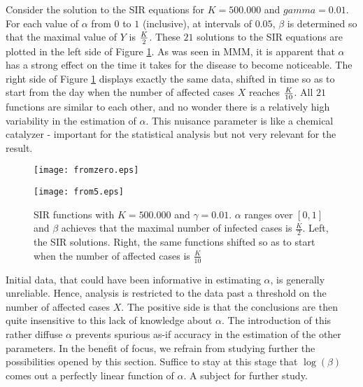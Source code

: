 \documentclass{article}
\begin{document}
 

Consider the solution to the SIR equations for $K=500.000$ and $gamma=0.01$. For each value of $\alpha$ from $0$ to $1$ (inclusive), at intervals of $0.05$, $\beta$ is determined so that the maximal value of $Y$ is ${K \over 2}$. These $21$ solutions to the SIR equations are plotted in the left side of Figure \ref{fromtimes}. As was seen in MMM, it is apparent that $\alpha$ has a strong effect on the time it takes for the disease to become noticeable. The right side of Figure \ref{fromtimes} displays exactly the same data, shifted in time so as to start from the day when the number of affected cases $X$ reaches ${K \over 10}$. All $21$ functions are similar to each other, and no wonder there is a relatively high variability in the estimation of $\alpha$. This nuisance parameter is like a chemical catalyzer - important for the statistical analysis but not very relevant for the result.

 

\begin{figure}

\begin{center}


{\texttt{[image: fromzero.eps]}}

\qquad

{\texttt{[image: from5.eps]}}

\end{center}

\begin{center}

\caption{SIR functions with $K=500.000$ and $\gamma=0.01$. $\alpha$ ranges over $[0,1]$ and $\beta$ achieves that the maximal number of infected cases is $\frac{K}{2}$. Left, the SIR solutions. Right, the same functions shifted so as to start when the number of affected cases is $\frac{K}{10}$}
\label{fromtimes}
\end{center}
\end{figure}
Initial data, that could have been informative in estimating $\alpha$, is generally unreliable. Hence, analysis is restricted to the data past a threshold on the number of affected cases $X$. The positive side is that the conclusions are then quite insensitive to this lack of knowledge about $\alpha$. The introduction of this rather diffuse $\alpha$ prevents spurious as-if accuracy in the estimation of the other parameters.
In the benefit of focus, we refrain from studying further the possibilities opened by this section. Suffice to stay at this stage that $\log(\beta)$ comes out a perfectly linear function of $\alpha$. A subject for further study.
\end{document}
